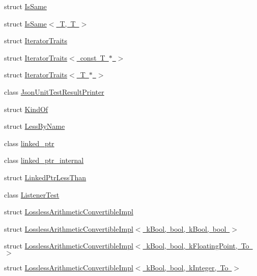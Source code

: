 \begin{DoxyCompactItemize}
struct \mbox{\hyperlink{structtesting_1_1internal_1_1IsSame}{Is\+Same}}
\item 
struct \mbox{\hyperlink{structtesting_1_1internal_1_1IsSame_3_01T_00_01T_01_4}{Is\+Same$<$ T, T $>$}}
\item 
struct \mbox{\hyperlink{structtesting_1_1internal_1_1IteratorTraits}{Iterator\+Traits}}
\item 
struct \mbox{\hyperlink{structtesting_1_1internal_1_1IteratorTraits_3_01const_01T_01_5_01_4}{Iterator\+Traits$<$ const T $\ast$ $>$}}
\item 
struct \mbox{\hyperlink{structtesting_1_1internal_1_1IteratorTraits_3_01T_01_5_01_4}{Iterator\+Traits$<$ T $\ast$ $>$}}
\item 
class \mbox{\hyperlink{classtesting_1_1internal_1_1JsonUnitTestResultPrinter}{Json\+Unit\+Test\+Result\+Printer}}
\item 
struct \mbox{\hyperlink{structtesting_1_1internal_1_1KindOf}{Kind\+Of}}
\item 
struct \mbox{\hyperlink{structtesting_1_1internal_1_1LessByName}{Less\+By\+Name}}
\item 
class \mbox{\hyperlink{classtesting_1_1internal_1_1linked__ptr}{linked\+\_\+ptr}}
\item 
class \mbox{\hyperlink{classtesting_1_1internal_1_1linked__ptr__internal}{linked\+\_\+ptr\+\_\+internal}}
\item 
struct \mbox{\hyperlink{structtesting_1_1internal_1_1LinkedPtrLessThan}{Linked\+Ptr\+Less\+Than}}
\item 
class \mbox{\hyperlink{classtesting_1_1internal_1_1ListenerTest}{Listener\+Test}}
\item 
struct \mbox{\hyperlink{structtesting_1_1internal_1_1LosslessArithmeticConvertibleImpl}{Lossless\+Arithmetic\+Convertible\+Impl}}
\item 
struct \mbox{\hyperlink{structtesting_1_1internal_1_1LosslessArithmeticConvertibleImpl_3_01kBool_00_01bool_00_01kBool_00_01bool_01_4}{Lossless\+Arithmetic\+Convertible\+Impl$<$ k\+Bool, bool, k\+Bool, bool $>$}}
\item 
struct \mbox{\hyperlink{structtesting_1_1internal_1_1LosslessArithmeticConvertibleImpl_3_01kBool_00_01bool_00_01kFloatingPoint_00_01To_01_4}{Lossless\+Arithmetic\+Convertible\+Impl$<$ k\+Bool, bool, k\+Floating\+Point, To $>$}}
\item 
struct \mbox{\hyperlink{structtesting_1_1internal_1_1LosslessArithmeticConvertibleImpl_3_01kBool_00_01bool_00_01kInteger_00_01To_01_4}{Lossless\+Arithmetic\+Convertible\+Impl$<$ k\+Bool, bool, k\+Integer, To $>$}}

\end{DoxyCompactItemize}
